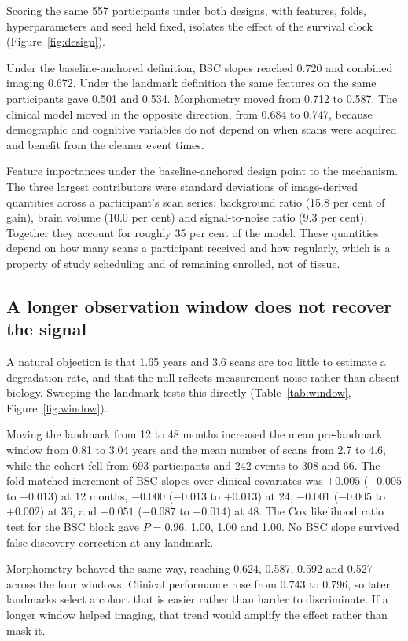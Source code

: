\documentclass[blue]{ludusofficial}
\begin{document}
Scoring the same 557 participants under both designs, with features, folds, hyperparameters and seed held fixed, isolates the effect of the survival clock (Figure~\ref{fig:design}).

Under the baseline-anchored definition, BSC slopes reached 0.720 and combined imaging 0.672. Under the landmark definition the same features on the same participants gave 0.501 and 0.534. Morphometry moved from 0.712 to 0.587. The clinical model moved in the opposite direction, from 0.684 to 0.747, because demographic and cognitive variables do not depend on when scans were acquired and benefit from the cleaner event times.

Feature importances under the baseline-anchored design point to the mechanism. The three largest contributors were standard deviations of image-derived quantities across a participant's scan series: background ratio (15.8 per cent of gain), brain volume (10.0 per cent) and signal-to-noise ratio (9.3 per cent). Together they account for roughly 35 per cent of the model. These quantities depend on how many scans a participant received and how regularly, which is a property of study scheduling and of remaining enrolled, not of tissue.

\subsection{A longer observation window does not recover the signal}

A natural objection is that 1.65 years and 3.6 scans are too little to estimate a degradation rate, and that the null reflects measurement noise rather than absent biology. Sweeping the landmark tests this directly (Table~\ref{tab:window}, Figure~\ref{fig:window}).

Moving the landmark from 12 to 48 months increased the mean pre-landmark window from 0.81 to 3.04 years and the mean number of scans from 2.7 to 4.6, while the cohort fell from 693 participants and 242 events to 308 and 66. The fold-matched increment of BSC slopes over clinical covariates was $+0.005$ ($-0.005$ to $+0.013$) at 12 months, $-0.000$ ($-0.013$ to $+0.013$) at 24, $-0.001$ ($-0.005$ to $+0.002$) at 36, and $-0.051$ ($-0.087$ to $-0.014$) at 48. The Cox likelihood ratio test for the BSC block gave $P = 0.96$, 1.00, 1.00 and 1.00. No BSC slope survived false discovery correction at any landmark.

Morphometry behaved the same way, reaching 0.624, 0.587, 0.592 and 0.527 across the four windows. Clinical performance rose from 0.743 to 0.796, so later landmarks select a cohort that is easier rather than harder to discriminate. If a longer window helped imaging, that trend would amplify the effect rather than mask it.
\end{document}
